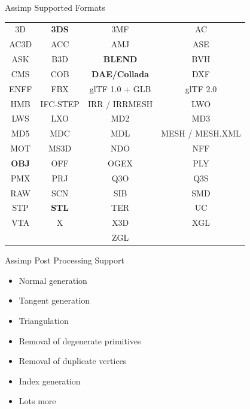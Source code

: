 \documentclass{beamer}
\begin{document}
\begin{frame}[fragile]{Assimp Supported Formats}
    \begin{table}
        \centering
        \begin{tabular}{cccc}
            3D           & \textbf{3DS} & 3MF                  & AC              \\
            AC3D         & ACC          & AMJ                  & ASE             \\
            ASK          & B3D          & \textbf{BLEND}       & BVH             \\
            CMS          & COB          & \textbf{DAE/Collada} & DXF             \\
            ENFF         & FBX          & glTF 1.0 + GLB       & glTF 2.0        \\
            HMB          & IFC-STEP     & IRR / IRRMESH        & LWO             \\
            LWS          & LXO          & MD2                  & MD3             \\
            MD5          & MDC          & MDL                  & MESH / MESH.XML \\
            MOT          & MS3D         & NDO                  & NFF             \\
            \textbf{OBJ} & OFF          & OGEX                 & PLY             \\
            PMX          & PRJ          & Q3O                  & Q3S             \\
            RAW          & SCN          & SIB                  & SMD             \\
            STP          & \textbf{STL} & TER                  & UC              \\
            VTA          & X            & X3D                  & XGL             \\
                         &              & ZGL                  &
        \end{tabular}
    \end{table}
\end{frame}

\begin{frame}[fragile]{Assimp Post Processing Support}
    \begin{itemize}
        \item Normal generation
        \item Tangent generation
        \item Triangulation
        \item Removal of degenerate primitives
        \item Removal of duplicate vertices
        \item Index generation
        \item Lots more
    \end{itemize}
\end{frame}
\end{document}
